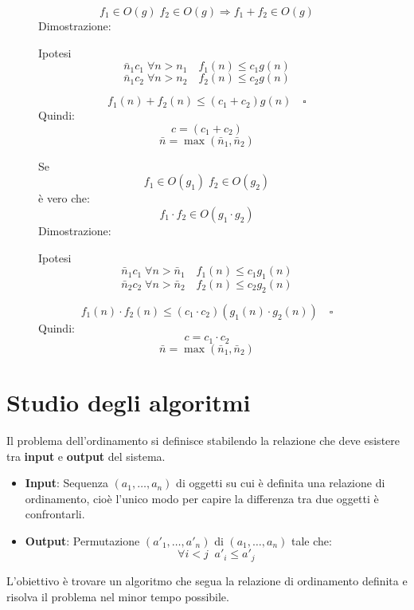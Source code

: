 \documentclass[a4paper]{article}
\begin{document}
\begin{figure}[H]
  \begin{example}
    \[
    f_1 \in O(g) \; f_2 \in O(g) \Rightarrow f_1 + f_2 \in O(g)
    \] 
    Dimostrazione:

    Ipotesi
    \[
      \bar{n}_1 c_1\; \forall n > n_1 \quad f_1(n) \le c_1 g(n)
    \] 
    \[
      \bar{n}_1 c_2\; \forall n > n_2 \quad f_2(n) \le c_2 g(n)
    \] 

    \[
    f_1(n) + f_2(n) \le (c_1 + c_2)g(n) \quad \square
    \] 
    Quindi:
    \[
    c = (c_1 + c_2)
    \] 
    \[
      \bar{n} = \max(\bar{n}_1, \bar{n}_2)
    \] 
  \end{example}
\end{figure}

\begin{figure}[H]
  \begin{example}
    Se
    \[
    f_1 \in O(g_1) \; f_2 \in O(g_2)
    \] 
    è vero che:
    \[
    f_1 \cdot f_2 \in O(g_1 \cdot g_2)
    \] 
    Dimostrazione:

    Ipotesi
    \[
      \bar{n}_1 c_1\; \forall n > \bar{n}_1 \quad f_1(n) \le c_1 g_1(n)
    \] 
    \[
      \bar{n}_2 c_2\; \forall n > \bar{n}_2 \quad f_2(n) \le c_2 g_2(n)
    \]

    \[
      f_1(n) \cdot f_2(n) \le (c_1 \cdot c_2) (g_1(n) \cdot g_2(n)) \quad \square
    \] 
    Quindi:
    \[
      c = c_1 \cdot c_2
    \]
    \[
      \bar{n} = \max(\bar{n}_1, \bar{n}_2)
    \]
  \end{example}
\end{figure}

\section{Studio degli algoritmi}
Il problema dell'ordinamento si definisce stabilendo la relazione che deve esistere tra
\textbf{input} e \textbf{output} del sistema.
\begin{itemize}
  \item \textbf{Input}: Sequenza \( (a_1,\ldots,a_n) \) di oggetti su cui è definita una
    relazione di ordinamento, cioè l'unico modo per capire la differenza tra due oggetti
    è confrontarli.

  \item \textbf{Output}: Permutazione \( (a'_1,\ldots,a'_n) \) di \( (a_1,\ldots,a_n) \) 
    tale che:
    \[
    \forall i < j \;\; a'_i \le a'_j
    \] 
\end{itemize}
L'obiettivo è trovare un algoritmo che segua la relazione di ordinamento definita e risolva
il problema nel minor tempo possibile.
\end{document}
